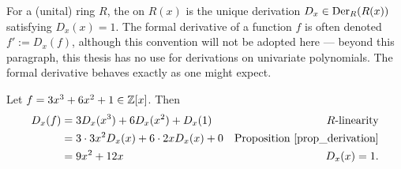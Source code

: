 For a (unital) ring $R$, the  on $R(x)$
is the unique derivation $D_x \in \operatorname{Der}_R(R(x))$ satisfying $D_x(x) = 1$.
The formal derivative of a function $f$ is often denoted $f' := D_x(f)$,
although this convention will not be adopted here ---
beyond this paragraph, this thesis has no use for derivations on univariate polynomials.
The formal derivative behaves exactly as one might expect.
\begin{example}
  Let $f = 3x^3 + 6x^2 + 1 \in \mathbb{Z}[x]$. Then
  \begin{align*}
    D_x(f) 
      &= 3D_x(x^3) + 6D_x(x^2) + D_x(1) & R\text{-linearity} \\
      &= 3 \cdot 3 x^2 D_x(x) + 6 \cdot 2 x D_x(x) + 0 & \text{Proposition \ref{prop_derivation}}\\
      &= 9 x^2 + 12 x & D_x(x) = 1.
  \end{align*}
\end{example}

